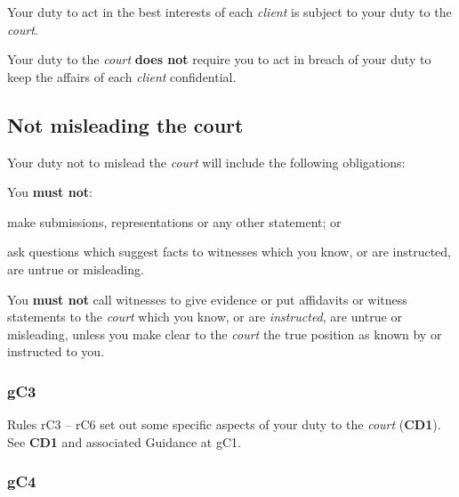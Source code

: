 
Your duty to act in the best interests of each \emph{client} is subject
to your duty to the \emph{court}.


Your duty to the \emph{court} \textcolor{myred}{\textbf{does not}} require you to act in breach of
your duty to keep the affairs of each \emph{client} confidential.

\subsection{Not misleading the court}


Your duty not to mislead the \emph{court} will include the following
obligations:
\begin{numlist}\item You \textcolor{myred}{\textbf{must not}}:
\begin{alphlist}\item make submissions, representations or any other statement; or
\item ask questions which suggest facts to witnesses
which you know, or are instructed, are untrue or misleading.\end{alphlist}
\item You \textcolor{myred}{\textbf{must not}} call witnesses to give evidence or put affidavits or
witness statements to the \emph{court} which you know, or are
\emph{instructed}, are untrue or misleading, unless you make clear to
the \emph{court} the true position as known by or instructed to you.
\end{numlist}



\subsubsection{\color{darkgrey}gC3}

Rules rC3 -- rC6 set out some specific aspects of your duty to the
\emph{court} (\textcolor{mygold}{\textbf{CD1}}). See \textbf{\textcolor{mygold}{CD1}} and associated Guidance at gC1.

\subsubsection{\color{darkgrey}gC4}

